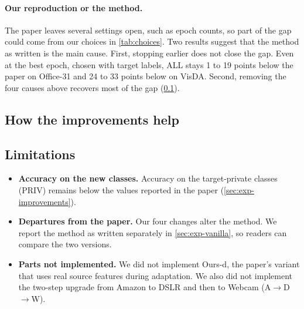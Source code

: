 \paragraph{Our reproduction or the method.}
The paper leaves several settings open, such as epoch counts, so part of the gap could come from our choices in \cref{tab:choices}.
Two results suggest that the method as written is the main cause.
First, stopping earlier does not close the gap.
Even at the best epoch, chosen with target labels, ALL stays 1 to 19 points below the paper on Office-31 and 24 to 33 points below on VisDA.
Second, removing the four causes above recovers most of the gap (\cref{sec:disc-improvements}).

\subsection{How the improvements help}\label{sec:disc-improvements}

\subsection{Limitations}\label{sec:disc-limitations}
\begin{itemize}
  \item \textbf{Accuracy on the new classes.} Accuracy on the target-private classes (PRIV) remains below the values reported in the paper (\cref{sec:exp-improvements}).
  \item \textbf{Departures from the paper.} Our four changes alter the method. We report the method as written separately in \cref{sec:exp-vanilla}, so readers can compare the two versions.
  \item \textbf{Parts not implemented.} We did not implement Ours-d, the paper's variant that uses real source features during adaptation. We also did not implement the two-step upgrade from Amazon to DSLR and then to Webcam (A$\to$D$\to$W).
\end{itemize}
